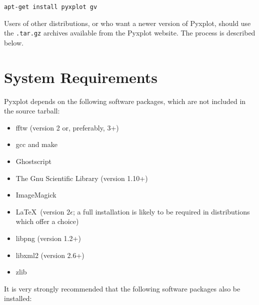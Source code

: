 \begin{verbatim}
apt-get install pyxplot gv
\end{verbatim}

Users of other distributions, or who want a newer version of Pyxplot, should
use the {\tt .tar.gz} archives available from the Pyxplot website. The process
is described below.

\section{System Requirements}

Pyxplot depends on the following software packages, which are not included in
the source tarball:

\vspace{0.5cm}
\begin{itemize}
\item fftw (version 2 or, preferably, 3+) 
\item gcc and make
\item Ghostscript 
\item The Gnu Scientific Library (version 1.10+) 
\item ImageMagick 
\item \LaTeX\ (version $2\epsilon$; a full installation is likely to be required in distributions which offer a choice) 
\item libpng (version 1.2+) 
\item libxml2 (version 2.6+) 
\item zlib 
\end{itemize}
\vspace{0.5cm}

\noindent It is very strongly recommended that the following software packages
also be installed:

